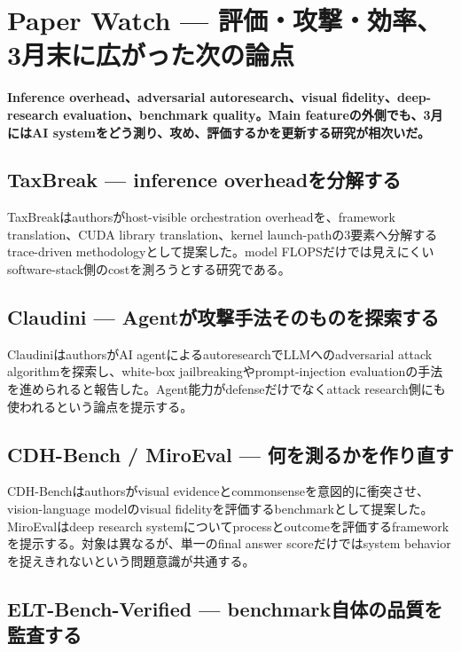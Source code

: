 \section{Paper Watch — 評価・攻撃・効率、3月末に広がった次の論点}
\label{pkg:paper-watch-march}
\noindent\textbf{Inference overhead、adversarial autoresearch、visual fidelity、deep-research evaluation、benchmark quality。Main featureの外側でも、3月にはAI systemをどう測り、攻め、評価するかを更新する研究が相次いだ。}\autocite{src-198727200361,src-4553a7bbd23e,src-5d84874f2d03,src-a27679e5527b,src-bb83c9c55568}

\subsection{TaxBreak — inference overheadを分解する}

TaxBreakはauthorsがhost-visible orchestration overheadを、framework translation、CUDA library translation、kernel launch-pathの3要素へ分解するtrace-driven methodologyとして提案した。model FLOPSだけでは見えにくいsoftware-stack側のcostを測ろうとする研究である。\autocite{src-198727200361}


\subsection{Claudini — Agentが攻撃手法そのものを探索する}

ClaudiniはauthorsがAI agentによるautoresearchでLLMへのadversarial attack algorithmを探索し、white-box jailbreakingやprompt-injection evaluationの手法を進められると報告した。Agent能力がdefenseだけでなくattack research側にも使われるという論点を提示する。\autocite{src-bb83c9c55568}


\subsection{CDH-Bench / MiroEval — 何を測るかを作り直す}

CDH-Benchはauthorsがvisual evidenceとcommonsenseを意図的に衝突させ、vision-language modelのvisual fidelityを評価するbenchmarkとして提案した。MiroEvalはdeep research systemについてprocessとoutcomeを評価するframeworkを提示する。対象は異なるが、単一のfinal answer scoreだけではsystem behaviorを捉えきれないという問題意識が共通する。\autocite{src-4553a7bbd23e,src-5d84874f2d03}


\subsection{ELT-Bench-Verified — benchmark自体の品質を監査する}

